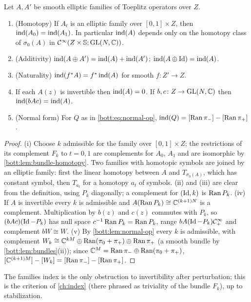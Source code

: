 \begin{proposition}\label{bott:prop:index-properties}
  Let $A,A'$ be smooth elliptic families of Toeplitz operators over $Z$.
  \begin{enumerate}[label=(\roman*)]
  \item (Homotopy) If $A_t$ is an elliptic family over $[0,1]\times Z$, then
    $\operatorname{ind}(A_0)=\operatorname{ind}(A_1)$. In particular $\operatorname{ind}(A)$ depends only on the homotopy class
    of $\sigma_0(A)$ in $\mathcal{C}^\infty(Z\times\mathbb{S};\operatorname{GL}(N,\mathbb{C}))$.
  \item (Additivity) $\operatorname{ind}(A\oplus A')=\operatorname{ind}(A)+\operatorname{ind}(A')$; $\operatorname{ind}(A\oplus\operatorname{Id})=\operatorname{ind}(A)$.
  \item (Naturality) $\operatorname{ind}(f^*A)=f^*\operatorname{ind}(A)$ for smooth $f\colon Z'\to Z$.
  \item If each $A(z)$ is invertible then $\operatorname{ind}(A)=0$. If $b,c\colon Z\to\operatorname{GL}(N,\mathbb{C})$
    then $\operatorname{ind}(bAc)=\operatorname{ind}(A)$.
  \item (Normal form) For $Q$ as in \eqref{bott:eq:normal-op},
    $\operatorname{ind}(Q)=[\operatorname{Ran}\pi_-]-[\operatorname{Ran}\pi_+]$.
  \end{enumerate}
\end{proposition}
\begin{proof}
  (i) Choose $k$ admissible for the family over $[0,1]\times Z$; the restrictions of its
  complement $F_k$ to $t=0,1$ are complements for $A_0$, $A_1$ and are isomorphic by
  \cref{bott:lem:bundle-homotopy}. Two families with homotopic symbols are joined by an
  elliptic family: first the linear homotopy between $A$ and $T_{\sigma_0(A)}$, which has
  constant symbol, then $T_{a_t}$ for a homotopy $a_t$ of symbols. (ii) and (iii) are clear
  from the definition, using $P_k$ diagonally; a complement for $(\operatorname{Id},k)$ is $\operatorname{Ran} P_k$.
  (iv) If $A$ is invertible every $k$ is admissible and $A(\operatorname{Ran} P_k)\cong\mathbb{C}^{(k+1)N}$ is a
  complement. Multiplication by $b(z)$ and $c(z)$ commutes with $P_k$, so
  $(bAc)(\operatorname{Id}-P_k)$ has null space $c^{-1}\operatorname{Ran} P_k=\operatorname{Ran} P_k$, range $bA(\operatorname{Id}-P_k)\mathcal{C}^\infty_+$ and
  complement $bW\cong W$. (v) By \cref{bott:lem:normal-op} every $k$ is admissible, with
  complement $W_k\cong\mathbb{C}^{kM}\oplus\operatorname{Ran}(\pi_0+\pi_+)\oplus\operatorname{Ran}\pi_+$ (a smooth bundle by
  \cref{bott:lem:bundles}(ii)); since $\mathbb{C}^M=\operatorname{Ran}\pi_-\oplus\operatorname{Ran}(\pi_0+\pi_+)$,
  $[\mathbb{C}^{(k+1)M}]-[W_k]=[\operatorname{Ran}\pi_-]-[\operatorname{Ran}\pi_+]$.
\end{proof}

The families index is the only obstruction to invertibility after perturbation; this
is the criterion of \cref{ch:index} (there phrased as triviality of the bundle $F_k$),
up to stabilization.

